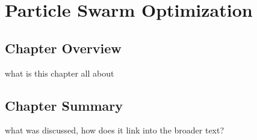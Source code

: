 %
%


%
%
\chapter{Particle Swarm Optimization}
\label{ch:pso}

%
%
\section{Chapter Overview}
\label{sec:pso:overview}
what is this chapter all about

%
%
\newpage



%
%
\section{Chapter Summary}
\label{sec:pso:summary}
what was discussed, how does it link into the broader text?



